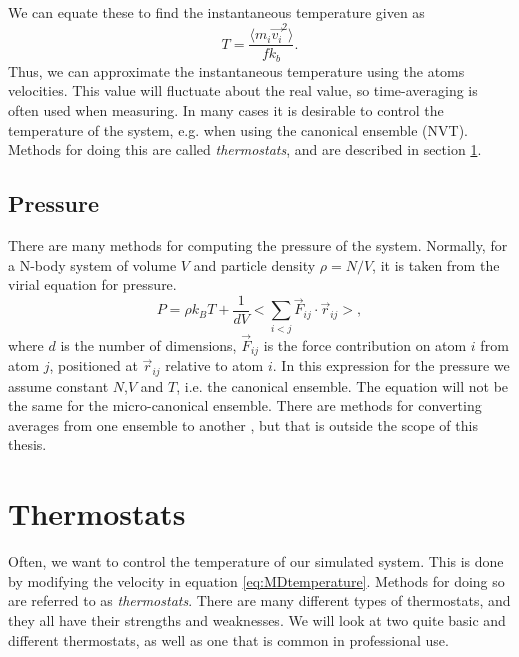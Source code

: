 \documentclass[twoside,english]{uiofysmaster}
\begin{document}
We can equate these to find the instantaneous temperature given as
\begin{equation}\label{eq:MDtemperature}
T = \frac{\langle m_i \vec{v_i}^2\rangle}{fk_b}.
\end{equation}
Thus, we can approximate the instantaneous temperature using the atoms velocities.
This value will fluctuate about the real value, so time-averaging is often used when measuring.
In many cases it is desirable to control the temperature of the system, e.g. when using the canonical ensemble (NVT).
Methods for doing this are called \textit{thermostats}, and are described in section \ref{sec:thermostats}.


\subsection{Pressure}
There are many methods for computing the pressure of the system. 
Normally, for a N-body system of volume $V$ and particle density $\rho=N/V$, it is taken from the virial equation for pressure. 
\begin{equation}
	P = \rho k_B T + \frac{1}{dV}\Big< \sum_{i<j} \vec{F}_{ij} \cdot \vec{r}_{ij}\Big> ,
\end{equation}
where $d$ is the number of dimensions, $\vec{F}_{ij}$ is the force contribution on atom $i$ from atom $j$, positioned at $\vec{r}_{ij}$ relative to atom $i$.
In this expression for the pressure we assume constant $N$,$V$ and $T$, i.e. the canonical ensemble.
The equation will not be the same for the micro-canonical ensemble.
There are methods for converting averages from one ensemble to another \cite{Lebowitz}, but that is outside the scope of this thesis.


\section{Thermostats}\label{sec:thermostats}
Often, we want to control the temperature of our simulated system.
This is done by modifying the velocity in equation \eqref{eq:MDtemperature}. 
Methods for doing so are referred to as \textit{thermostats}. 
There are many different types of thermostats, and they all have their strengths and weaknesses.
We will look at two quite basic and different thermostats, as well as one that is common in professional use.   
\end{document}
